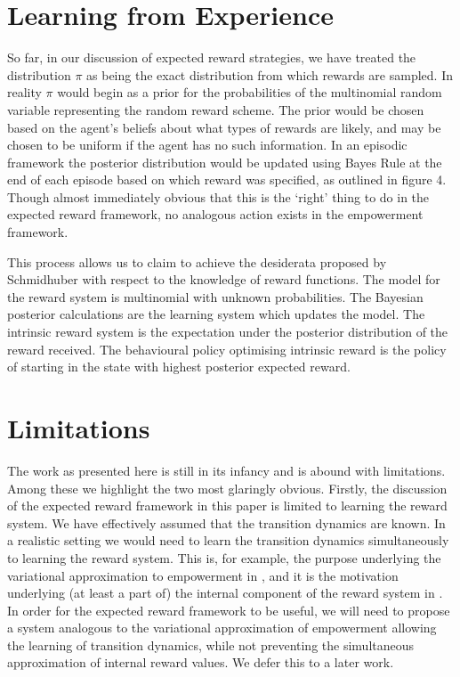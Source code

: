 \documentclass{article}
\begin{document}
\section{Learning from Experience}
So far, in our discussion of expected reward strategies, we have treated the distribution $\pi$ as being the exact distribution from which rewards are sampled. In reality $\pi$ would begin as a prior for the probabilities of the multinomial random variable representing the random reward scheme. The prior would be chosen based on the agent's beliefs about what types of rewards are likely, and may be chosen to be uniform if the agent has no such information. In an episodic framework the posterior distribution would be updated using Bayes Rule at the end of each episode based on which reward was specified, as outlined in figure 4. Though almost immediately obvious that this is the `right' thing to do in the expected reward framework, no analogous action exists in the empowerment framework. 

This process allows us to claim to achieve the desiderata proposed by Schmidhuber with respect to the knowledge of reward functions. The model for the reward system is multinomial with unknown probabilities. The Bayesian posterior calculations are the learning system which updates the model. The intrinsic reward system is the expectation under the posterior distribution of the reward received. The behavioural policy optimising intrinsic reward is the policy of starting in the state with highest posterior expected reward.

\section{Limitations}
The work as presented here is still in its infancy and is abound with limitations. Among these we highlight the two most glaringly obvious. Firstly, the discussion of the expected reward framework in this paper is limited to learning the reward system. We have effectively assumed that the transition dynamics are known. In a realistic setting we would need to learn the transition dynamics simultaneously to learning the reward system. This is, for example, the purpose underlying the variational approximation to empowerment in \cite{mohamed2015variational}, and it is the motivation underlying (at least a part of) the internal component of the reward system in \cite{schmidhuber2010formal}. In order for the expected reward framework to be useful, we will need to propose a system analogous to the variational approximation of empowerment allowing the learning of transition dynamics, while not preventing the simultaneous approximation of internal reward values. We defer this to a later work.
\end{document}
